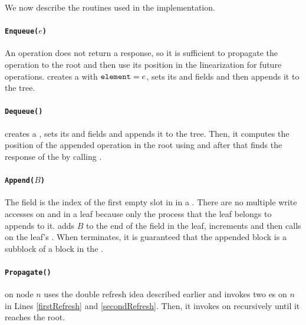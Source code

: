 We now describe the routines used in the implementation.

\paragraph{\tt{Enqueue($e$)}}
An  operation does not return a response, so it is
sufficient to propagate the  operation to the root and
then use its position in the linearization for future 
operations.  creates a  with
${\normalfont{\texttt{element}}}=e$, sets its  and 
fields and then appends it to the tree. 

\paragraph{\tt{Dequeue()}}
 creates a , sets its  and
 fields and appends it to the tree. Then, it computes
the position of the appended  operation in the root using
 and after that finds the response of the
 by calling . 

\paragraph{\tt{Append($B$)}}
The  field is the index of the first empty slot in
 in a . There are no multiple write accesses
on  and  in a leaf because only the process that
the leaf belongs to appends to it.  adds $B$ to the
end of the  field in the leaf, increments  and
then calls  on the leaf's . When
 terminates, it is guaranteed that the appended block is
a subblock of a block in the .  

\paragraph{\tt{Propagate()}}
 on node $n$ uses the double refresh idea described
earlier and invokes two es on $n$ in Lines
\ref{firstRefresh} and \ref{secondRefresh}. Then, it invokes
 on  recursively until it reaches the
root.  

